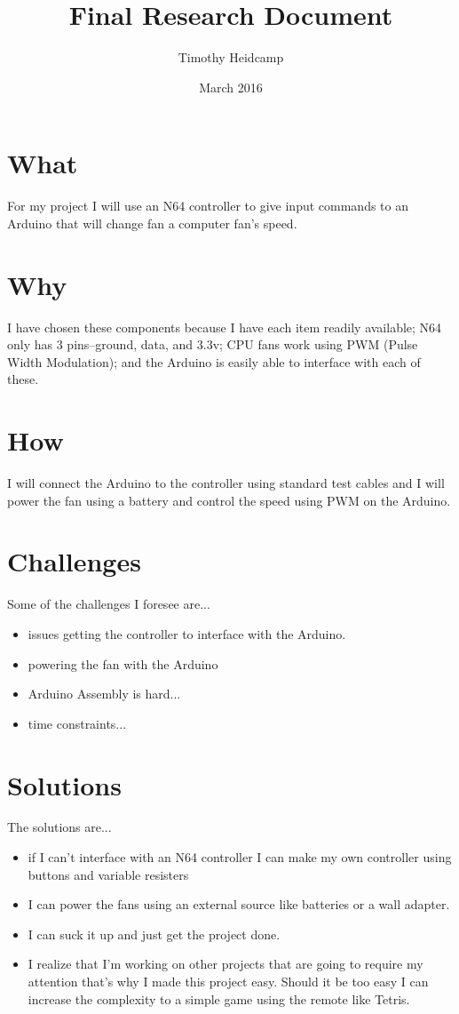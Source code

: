 \documentclass{article}
\title{Final Research Document}
\author{Timothy Heidcamp}
\date{March 2016}
\begin{document}
	\maketitle
	
	
	\section{What}
	For my project I will use an N64 controller to give input commands to an Arduino that will change fan a computer fan's speed.   
	
	\section{Why}
	I have chosen these components because I have each item readily available; N64 only has 3 pins--ground, data, and 3.3v; CPU fans work using PWM (Pulse Width Modulation); and the Arduino is easily able to interface with each of these. 
	
	\section{How}
	I will connect the Arduino to the controller using standard test cables and I will power the fan using a battery and control the speed using PWM on the Arduino. 
	
	\section{Challenges}
	Some of the challenges I foresee are...
	\begin{itemize}
		\item issues getting the controller to interface with the Arduino. 
		\item powering the fan with the Arduino
		\item Arduino Assembly is hard...
		\item time constraints...
	\end{itemize}
	
	\section{Solutions}
	The solutions are...
	\begin{itemize}
		\item if I can't interface with an N64 controller I can make my own controller using buttons and variable resisters
		\item I can power the fans using an external source like batteries or a wall adapter. 
		\item I can suck it up and just get the project done.
		\item I realize that I'm working on other projects that are going to require my attention that's why I made this project easy. Should it be too easy I can increase the complexity to a simple game using the remote like Tetris. 
	\end{itemize}
	
\end{document}
